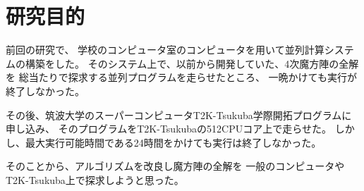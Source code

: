 \section{研究目的}
前回の研究で、
学校のコンピュータ室のコンピュータを用いて並列計算システムの構築をした。
そのシステム上で、以前から開発していた、4次魔方陣の全解を
総当たりで探求する並列プログラムを走らせたところ、
一晩かけても実行が終了しなかった。

その後、筑波大学のスーパーコンピュータT2K-Tsukuba学際開拓プログラムに申し込み、
そのプログラムをT2K-Tsukubaの512CPUコア上で走らせた。
しかし、最大実行可能時間である24時間をかけても実行は終了しなかった。

そのことから、アルゴリズムを改良し魔方陣の全解を
一般のコンピュータやT2K-Tsukuba上で探求しようと思った。
